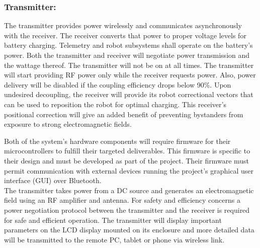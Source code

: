 \documentclass[12pt]{article}
\begin{document}
\subsubsection{Transmitter:} 
The transmitter provides power wirelessly and communicates asynchronously with the receiver.  The receiver converts that power to proper voltage levels for battery charging.  Telemetry and robot subsystems shall operate on the battery's power.  Both the transmitter and receiver will negotiate power transmission and the wattage thereof.  The transmitter will not be on at all times.  The transmitter will start providing RF power only while the receiver requests power.  Also, power delivery will be disabled if the coupling efficiency drops below 90\%.  Upon undesired decoupling, the receiver will provide its robot correctional vectors that can be used to reposition the robot for optimal charging. This receiver's positional correction will give an added benefit of preventing bystanders from exposure to strong electromagnetic fields. \\ \indent

Both of the system's hardware components will require firmware for their microcontrollers to fulfill their targeted deliverables.  This firmware is specific to their design and must be developed as part of the project.  Their firmware must permit communication with external devices running the project's graphical user interface (GUI) over Bluetooth.\\

The transmitter takes power from a DC source and generates an electromagnetic field using an RF amplifier and antenna. For safety and efficiency concerns a power negotiation protocol between the transmitter and the receiver is required for safe and efficient operation. The transmitter will display important parameters on the LCD display mounted on its enclosure and more detailed data will be transmitted to the remote PC, tablet or phone via wireless link.\\
\end{document}
